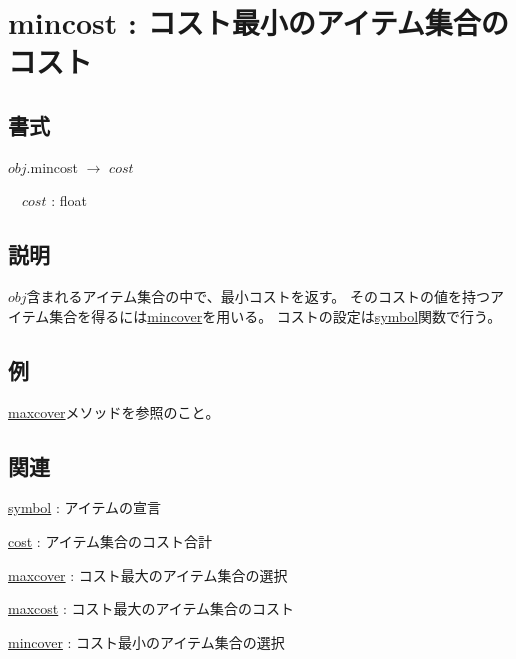 
\section{mincost : コスト最小のアイテム集合のコスト\label{sect:mincost}}
\subsection*{書式}
$obj$.mincost $\rightarrow$ $cost$

~~$cost$ : float

\subsection*{説明}
$obj$含まれるアイテム集合の中で、最小コストを返す。
そのコストの値を持つアイテム集合を得るには\hyperref[sect:mincover]{mincover}を用いる。
コストの設定は\hyperref[sect:symbol]{symbol}関数で行う。

\subsection*{例}

\hyperref[sect:maxcover]{maxcover}メソッドを参照のこと。

\subsection*{関連}
\hyperref[sect:symbol]{symbol} : アイテムの宣言

\hyperref[sect:cost]{cost} : アイテム集合のコスト合計

\hyperref[sect:maxcover]{maxcover} : コスト最大のアイテム集合の選択

\hyperref[sect:maxcost]{maxcost} : コスト最大のアイテム集合のコスト

\hyperref[sect:mincover]{mincover} : コスト最小のアイテム集合の選択


